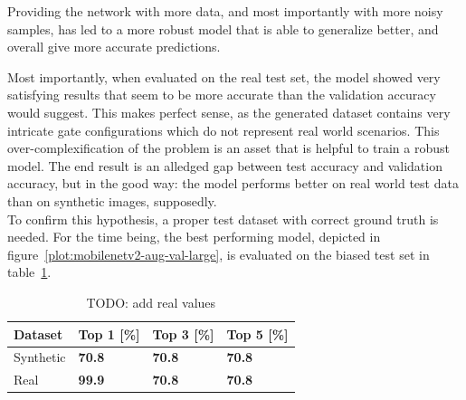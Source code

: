 Providing the network with more data, and most importantly with more noisy
samples, has led to a more robust model that is able to generalize better, and
overall give more accurate predictions.



Most importantly, when evaluated on the real test set, the model showed very
satisfying results that seem to be more accurate than the validation accuracy
would suggest. This makes perfect sense, as the generated dataset contains very
intricate gate configurations which do not represent real world scenarios. This
over-complexification of the problem is an asset that is helpful to train a
robust model. The end result is an alledged gap between test accuracy and
validation accuracy, but in the good way: the model performs better on real
world test data than on synthetic images, supposedly.\\

To confirm this hypothesis, a proper test dataset with correct ground truth is
needed. For the time being, the best performing model, depicted in
figure~\ref{plot:mobilenetv2-aug-val-large}, is evaluated on the biased test
set in table~\ref{table:mobilenetv2-best}.

\begin{table}[!h]
    \centering
    \caption{TODO: add real values}
    \begin{tabular}{llll}
        \toprule
		Dataset & Top 1 [\%] & Top 3 [\%] & Top 5 [\%]\\
        \midrule         
		Synthetic & \textbf{70.8} & \textbf{70.8} & \textbf{70.8} \\ 
        Real & \textbf{99.9} & \textbf{70.8} & \textbf{70.8} \\
        \bottomrule
    \end{tabular}
    \label{table:mobilenetv2-best}
\end{table}

